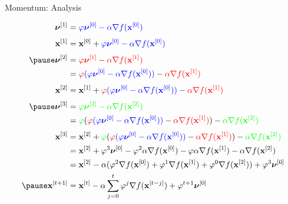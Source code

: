 \documentclass[11pt,compress,t,notes=noshow, xcolor=table]{beamer}
\begin{document}
\begin{frame}{Momentum: Analysis}
\footnotesize

\begin{equation*}
    \begin{aligned}
        \bm{\nu}^{[1]} &= \textcolor{blue}{\varphi \bm{\nu}^{[0]} - \alpha \nabla f(\xv^{[0]})} \\[0.1cm]
        \xv^{[1]} &= \xv^{[0]} + \textcolor{blue}{\varphi \bm{\nu}^{[0]} - \alpha \nabla f(\xv^{[0]})} \\[0.1cm]
        \pause
        \bm{\nu}^{[2]} &= \textcolor{red}{\varphi \bm{\nu}^{[1]} - \alpha \nabla f(\xv^{[1]})} \\
        &= \textcolor{red}{\varphi} \textcolor{blue}{(\varphi \bm{\nu}^{[0]} - \alpha \nabla f(\xv^{[0]}))} - \textcolor{red}{\alpha \nabla f(\xv^{[1]})} \\[0.1cm]
        \xv^{[2]} &= \xv^{[1]} +\textcolor{red}{\varphi} \textcolor{blue}{(\varphi \bm{\nu}^{[0]} - \alpha \nabla f(\xv^{[0]}))} - \textcolor{red}{\alpha \nabla f(\xv^{[1]})} \\[0.1cm]
        \pause
        \bm{\nu}^{[3]} &= \textcolor{green}{\varphi \bm{\nu}^{[2]} - \alpha \nabla f(\xv^{[2]})} \\
        &= \textcolor{green}{\varphi} (\textcolor{red}{\varphi} \textcolor{blue}{(\varphi \bm{\nu}^{[0]} - \alpha \nabla f(\xv^{[0]}))} - \textcolor{red}{\alpha \nabla f(\xv^{[1]})}) - \textcolor{green}{\alpha \nabla f(\xv^{[2]})} \\[0.1cm]
        \xv^{[3]} &= \xv^{[2]} + \textcolor{green}{\varphi} (\textcolor{red}{\varphi} \textcolor{blue}{(\varphi \bm{\nu}^{[0]} - \alpha \nabla f(\xv^{[0]}))} - \textcolor{red}{\alpha \nabla f(\xv^{[1]})}) - \textcolor{green}{\alpha \nabla f(\xv^{[2]})}  \\
        &= \xv^{[2]} + \varphi^3\bm{\nu}^{[0]} - \varphi^2\alpha\nabla f(\xv^{[0]}) - \varphi \alpha \nabla f(\xv^{[1]}) - \alpha \nabla f(\xv^{[2]}) \\
        &= \xv^{[2]} - \alpha(\varphi^2 \nabla f(\xv^{[0]}) + \varphi^1 \nabla f(\xv^{[1]}) + \varphi^0 \nabla f(\xv^{[2]})) + \varphi^3 \bm{\nu}^{[0]} \\
        \pause
        \xv^{[t+1]} &= \xv^{[t]} - \alpha \displaystyle\sum_{j = 0}^{t} \varphi^j \nabla f(\xv^{[t-j]}) + \varphi^{t+1}\bm{\nu}^{[0]}
    \end{aligned}
\end{equation*}
\end{frame}
\end{document}
